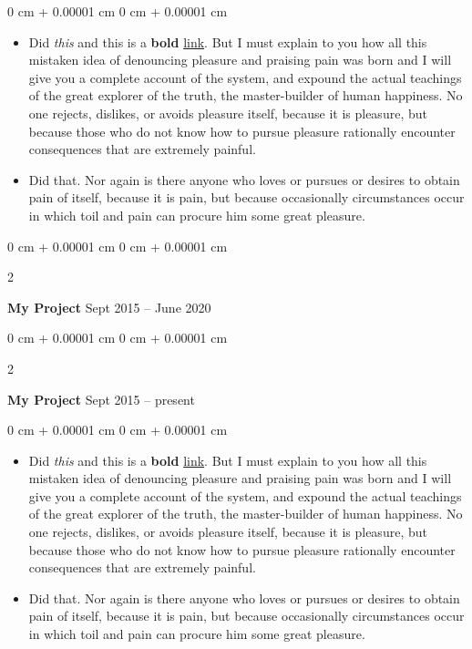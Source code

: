 \documentclass[10pt, letterpaper]{article}
\newenvironment{highlights}{
    \begin{itemize}[
        topsep=0.10 cm,
        parsep=0.10 cm,
        partopsep=0pt,
        itemsep=0pt,
        leftmargin=0 cm + 10pt
    ]
}{
    \end{itemize}
} %
\newenvironment{onecolentry}{
    \begin{adjustwidth}{
        0 cm + 0.00001 cm
    }{
        0 cm + 0.00001 cm
    }
}{
    \end{adjustwidth}
} %
\newenvironment{twocolentry}[2][]{
    \onecolentry
    \def\secondColumn{#2}
    \setcolumnwidth{\fill, 4.5 cm}
    \begin{paracol}{2}
}{
    \switchcolumn \raggedleft \secondColumn
    \end{paracol}
    \endonecolentry
} %
\begin{document}
        \vspace{0.10 cm}
        \begin{onecolentry}
            \begin{highlights}
                \item Did \textit{this} and this is a \textbf{bold} \href{https://example.com}{link}. But I must explain to you how all this mistaken idea of denouncing pleasure and praising pain was born and I will give you a complete account of the system, and expound the actual teachings of the great explorer of the truth, the master-builder of human happiness. No one rejects, dislikes, or avoids pleasure itself, because it is pleasure, but because those who do not know how to pursue pleasure rationally encounter consequences that are extremely painful.
                \item Did that. Nor again is there anyone who loves or pursues or desires to obtain pain of itself, because it is pain, but because occasionally circumstances occur in which toil and pain can procure him some great pleasure.
            \end{highlights}
        \end{onecolentry}


        \vspace{0.2 cm}

        \begin{twocolentry}{
            Sept 2015 – June 2020
        }
            \textbf{My Project}\end{twocolentry}



        \vspace{0.2 cm}

        \begin{twocolentry}{
            Sept 2015 – present
        }
            \textbf{My Project}\end{twocolentry}

        \vspace{0.10 cm}
        \begin{onecolentry}
            \begin{highlights}
                \item Did \textit{this} and this is a \textbf{bold} \href{https://example.com}{link}. But I must explain to you how all this mistaken idea of denouncing pleasure and praising pain was born and I will give you a complete account of the system, and expound the actual teachings of the great explorer of the truth, the master-builder of human happiness. No one rejects, dislikes, or avoids pleasure itself, because it is pleasure, but because those who do not know how to pursue pleasure rationally encounter consequences that are extremely painful.
                \item Did that. Nor again is there anyone who loves or pursues or desires to obtain pain of itself, because it is pain, but because occasionally circumstances occur in which toil and pain can procure him some great pleasure.
            \end{highlights}
        \end{onecolentry}
\end{document}
